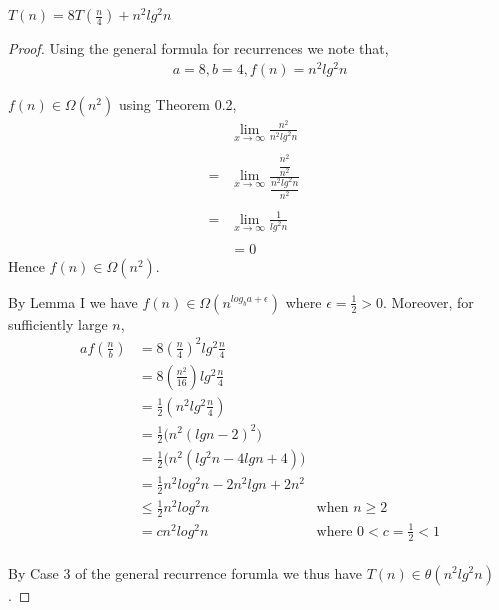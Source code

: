 \documentclass[12pt]{article}
\newenvironment{lemma}[2][Lemma]{\begin{trivlist}
\item[\hskip \labelsep {\bfseries #1}\hskip \labelsep {\bfseries #2.}]}{\end{trivlist}}
\newenvironment{question}[2][Question]{\begin{trivlist}
\item[\hskip \labelsep {\bfseries #1}\hskip \labelsep {\bfseries #2.}]}{\end{trivlist}}
\begin{document}
\begin{question}{5 (c)} $T(n) = 8T(\frac{n}{4}) + n^{2}lg^{2}n$
  \begin{proof}
    Using the general formula for recurrences we note that,
    \begin{align*}
      a = 8, b = 4, f(n) = n^{2}lg^{2}n
    \end{align*}

    \begin{lemma}{I} $f(n) \in \Omega(n^{2})$ using Theorem 0.2,
      \begin{align*}
          & \lim_{x\to\infty} \frac{n^{2}}{n^{2}lg^{2}n} &\\ \\
        = & \lim_{x\to\infty} \frac{
          \dfrac{n^{2}}{n^{2}}
        }{
          \dfrac{n^{2}lg^{2}n}{n^{2}}
        } &\\ \\
        = & \lim_{x\to\infty} \frac{
          1
        }{
          lg^{2}n
        }&\\ \\
        & = 0 &
      \end{align*}
      Hence $f(n) \in \Omega(n^{2})$.
    \end{lemma}

    By Lemma I we have $f(n) \in \Omega(n^{log_{b}a + \epsilon})$ where
    $\epsilon = \frac{1}{2} > 0$.
    Moreover, for sufficiently large $n$,
    \begin{align*}
      af(\frac{n}{b}) & = 8(\frac{n}{4})^{2}lg^{2}\frac{n}{4}&\\
                      & = 8(\frac{n^{2}}{16})lg^{2}\frac{n}{4}&\\
                      & = \frac{1}{2}(n^{2}lg^{2}\frac{n}{4})&\\
                      & = \frac{1}{2} \bigl(n^{2}(lgn - 2)^{2}\bigr) &\\
                      & = \frac{1}{2} \bigl(n^{2}(lg^{2}n - 4lgn + 4)\bigr) &\\
                      & = \frac{1}{2}n^{2}log^{2}n - 2n^{2}lgn + 2n^{2}&\\
                      & \leq \frac{1}{2}n^{2}log^{2}n & \text{when $n \geq 2$}\\
                      & = cn^{2}log^{2}n & \text{where $0 < c = \frac{1}{2} < 1$}\\
    \end{align*}

    By Case 3 of the general recurrence forumla we thus have $T(n) \in \theta(n^{2}lg^{2}n)$.
  \end{proof}
\end{question}
\end{document}
